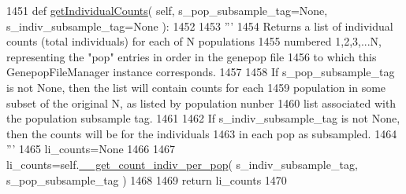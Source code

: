\begin{DoxyCode}
1451     \textcolor{keyword}{def }\hyperlink{classnegui_1_1genepopfilemanager_1_1GenepopFileManager_aca743749002b9828cd66730e42db4387}{getIndividualCounts}( self, s\_pop\_subsample\_tag=None, s\_indiv\_subsample\_tag=None 
      ):
1452 
1453         \textcolor{stringliteral}{'''}
1454 \textcolor{stringliteral}{        Returns a list of individual counts (total individuals) for each of N populations}
1455 \textcolor{stringliteral}{        numbered 1,2,3,...N, representing the "pop" entries in order in the genepop file}
1456 \textcolor{stringliteral}{        to which this GenepopFileManager instance corresponds.}
1457 \textcolor{stringliteral}{}
1458 \textcolor{stringliteral}{        If s\_pop\_subsample\_tag is not None, then the list will contain counts for each}
1459 \textcolor{stringliteral}{        population in some subset of the original N, as listed by population nunber }
1460 \textcolor{stringliteral}{        list associated with the population subsample tag.}
1461 \textcolor{stringliteral}{}
1462 \textcolor{stringliteral}{        If s\_indiv\_subsample\_tag is not None, then the counts will be for the individuals}
1463 \textcolor{stringliteral}{        in each pop as subsampled.}
1464 \textcolor{stringliteral}{        '''}
1465         li\_counts=\textcolor{keywordtype}{None}
1466 
1467         li\_counts=self.\hyperlink{classnegui_1_1genepopfilemanager_1_1GenepopFileManager_a8efe11151549d7da2bc024f836491af4}{\_\_get\_count\_indiv\_per\_pop}( s\_indiv\_subsample\_tag, 
      s\_pop\_subsample\_tag ) 
1468 
1469         \textcolor{keywordflow}{return} li\_counts
1470 
\end{DoxyCode}
